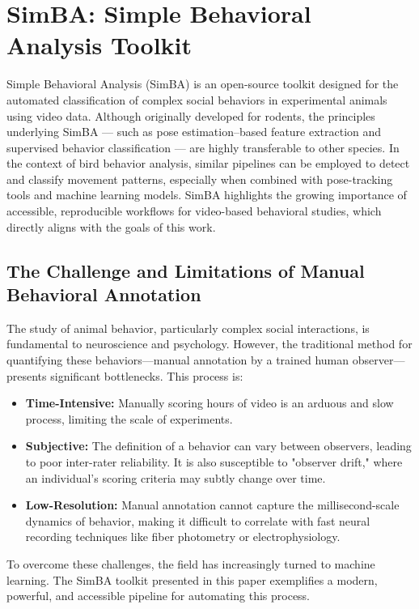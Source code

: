 \section{SimBA: Simple Behavioral Analysis Toolkit}

Simple Behavioral Analysis (SimBA) is an open-source toolkit designed for the automated classification of complex social behaviors in experimental animals using video data. Although originally developed for rodents, the principles underlying SimBA — such as pose estimation–based feature extraction and supervised behavior classification — are highly transferable to other species. In the context of bird behavior analysis, similar pipelines can be employed to detect and classify movement patterns, especially when combined with pose-tracking tools and machine learning models. SimBA highlights the growing importance of accessible, reproducible workflows for video-based behavioral studies, which directly aligns with the goals of this work.

\subsection{The Challenge and Limitations of Manual Behavioral Annotation}

The study of animal behavior, particularly complex social interactions, is fundamental to neuroscience and psychology. However, the traditional method for quantifying these behaviors—manual annotation by a trained human observer—presents significant bottlenecks. This process is:
\begin{itemize}
    \item \textbf{Time-Intensive:} Manually scoring hours of video is an arduous and slow process, limiting the scale of experiments.
    \item \textbf{Subjective:} The definition of a behavior can vary between observers, leading to poor inter-rater reliability. It is also susceptible to "observer drift," where an individual's scoring criteria may subtly change over time.
    \item \textbf{Low-Resolution:} Manual annotation cannot capture the millisecond-scale dynamics of behavior, making it difficult to correlate with fast neural recording techniques like fiber photometry or electrophysiology.
\end{itemize}
To overcome these challenges, the field has increasingly turned to machine learning. The SimBA toolkit presented in this paper exemplifies a modern, powerful, and accessible pipeline for automating this process.

